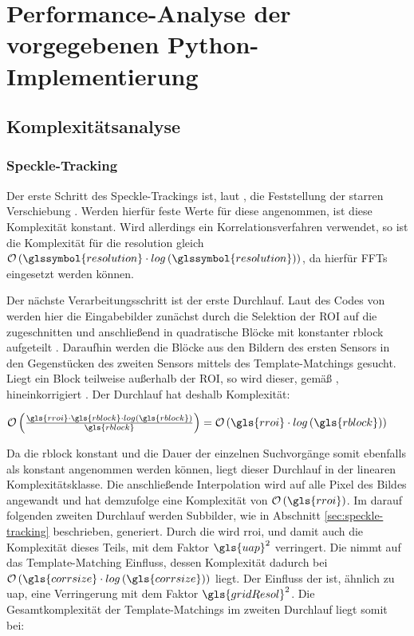 \chapter{Performance-Analyse der vorgegebenen Python-Implementierung}

\section{Komplexitätsanalyse}

\subsection{Speckle-Tracking}

Der erste Schritt des Speckle-Trackings ist, laut \citeauthor{Ber13, Coj17}, die Feststellung der starren Verschiebung \cite{Ber13, Coj17}. Werden hierfür feste Werte für diese angenommen, ist diese Komplexität konstant. Wird allerdings ein Korrelationsverfahren verwendet, so ist die Komplexität für die \gls{resolution} gleich $\mathcal{O}\left(\glssymbol{resolution} \cdot log\left(\glssymbol{resolution}\right)\right)$, da hierfür \glspl{FFT} eingesetzt werden können. 

Der nächste Verarbeitungsschritt ist der erste Durchlauf. Laut des Codes von \citeauthor{Coj17} werden hier die Eingabebilder zunächst durch die Selektion der \gls{ROI} auf die   zugeschnitten und anschließend in quadratische Blöcke mit konstanter \gls{rblock} aufgeteilt \cite{Coj17}. Daraufhin werden die Blöcke aus den Bildern des ersten Sensors in den Gegenstücken des zweiten Sensors mittels des Template-Matchings gesucht. Liegt ein Block teilweise außerhalb der \gls{ROI}, so wird dieser, gemäß \citeauthor{Coj17}, hineinkorrigiert \cite{Coj17}. Der Durchlauf hat deshalb Komplexität: 

\begin{center}
	$\mathcal{O}\left(\frac{\gls{rroi} \cdot \gls{rblock} \cdot log\left(\gls{rblock}\right)}{\gls{rblock}}\right) = \mathcal{O}\left(\gls{rroi} \cdot log\left(\gls{rblock}\right)\right)$
\end{center}

Da die \gls{rblock} konstant und die Dauer der einzelnen Suchvorgänge somit ebenfalls als konstant angenommen werden können, liegt dieser Durchlauf in der linearen Komplexitätsklasse. Die anschließende Interpolation wird auf alle Pixel des Bildes angewandt und hat demzufolge eine Komplexität von $\mathcal{O}\left(\gls{rroi}\right)$. Im darauf folgenden zweiten Durchlauf werden Subbilder, wie in Abschnitt \ref{sec:speckle-tracking} beschrieben, generiert. Durch die   wird \gls{rroi}, und damit auch die Komplexität dieses Teils, mit dem Faktor $\gls{uap}^2$ verringert. Die   nimmt auf das Template-Matching Einfluss, dessen Komplexität dadurch bei $\mathcal{O}\left(\gls{corrsize} \cdot log\left(\gls{corrsize}\right)\right)$ liegt. Der Einfluss der   ist, ähnlich zu \gls{uap}, eine Verringerung mit dem Faktor $\gls{gridResol}^2$. Die Gesamtkomplexität der Template-Matchings im zweiten Durchlauf liegt somit bei:


